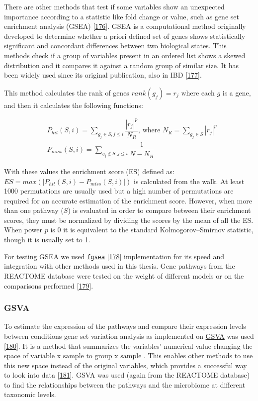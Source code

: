 \documentclass[
  12pt,
  a4paper,
  twoside,
  openright]{book}
\begin{document}
There are other methods that test if some variables show an unexpected importance according to a statistic like fold change or value, such as gene set enrichment analysis (GSEA) {[}\protect\hyperlink{ref-subramanian2005}{176}{]}.
GSEA is a computational method originally developed to determine whether a priori defined set of genes shows statistically significant and concordant differences between two biological states.
This methods check if a group of variables present in an ordered list shows a skewed distribution and it compares it against a random group of similar size.
It has been widely used since its original publication, also in IBD {[}\protect\hyperlink{ref-protiva2016}{177}{]}.

This method calculates the rank of genes \(rank(g_j)=r_j\) where each \(g\) is a gene, and then it calculates the following functions:

\[
\begin{aligned}
& P_{hit}(S, i) = \sum_{g_j \in S, j \leq i}\dfrac{|r_j|^p}{N_R} \text{, where } N_R = \sum_{g_j \in S}|r_j|^p \\
& P_{miss}(S, i) = \sum_{g_j \not \in S, j \leq i}\dfrac{1}{N - N_H}
\end{aligned}
\]

With these values the enrichment score (ES) defined as: \(ES=max(|P_{hit}(S, i)-P_{miss}(S, i)\vert)\) is calculated from the walk.
At least 1000 permutations are usually used but a high number of permutations are required for an accurate estimation of the enrichment score.
However, when more than one pathway (\(S\)) is evaluated in order to compare between their enrichment scores, they must be normalized by dividing the scores by the mean of all the ES.
When power \(p\) is 0 it is equivalent to the standard Kolmogorov--Smirnov statistic, though it is usually set to 1.

For testing GSEA we used \href{https://bioconductor.org/packages/fgsea}{\texttt{fgsea}} {[}\protect\hyperlink{ref-korotkevich2021}{178}{]} implementation for its speed and integration with other methods used in this thesis.
Gene pathways from the REACTOME database were tested on the weight of different models or on the comparisons performed {[}\protect\hyperlink{ref-fabregat2016}{179}{]}.

\hypertarget{gsva}{%
\subsubsection{GSVA}\label{gsva}}

To estimate the expression of the pathways and compare their expression levels between conditions gene set variation analysis as implemented on \href{https://bioconductor.org/packages/GSVA}{GSVA} was used {[}\protect\hyperlink{ref-huxe4nzelmann2013}{180}{]}.
It is a method that summarizes the variables' numerical value changing the space of \(\text{variable x sample}\) to \(\text{group x sample}\) .
This enables other methods to use this new space instead of the original variables, which provides a successful way to look into data {[}\protect\hyperlink{ref-escudero-hernuxe1ndez2021}{181}{]}.
GSVA was used (again from the REACTOME database) to find the relationships between the pathways and the microbiome at different taxonomic levels.
\end{document}
